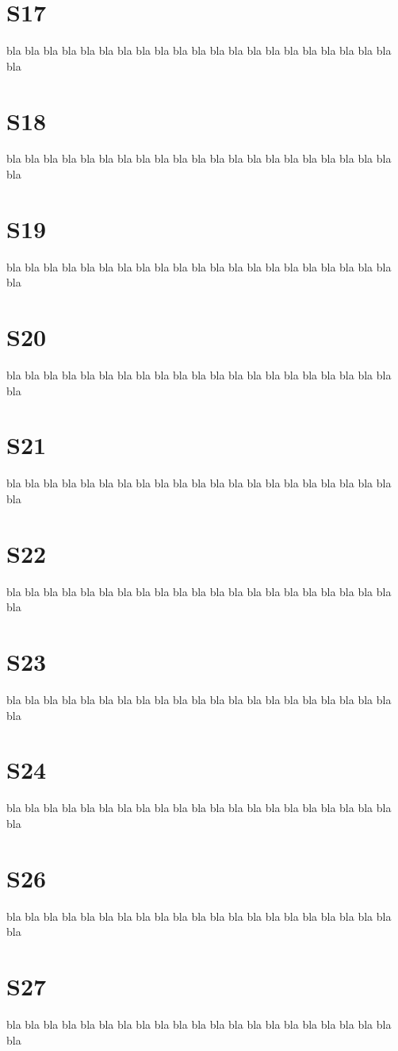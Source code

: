 \documentclass[12pt,a4paper]{report} %
\begin{document}
\section{S17}
bla bla bla bla bla bla bla bla bla bla bla
bla bla bla bla bla bla bla bla bla bla bla
\section{S18}
bla bla bla bla bla bla bla bla bla bla bla
bla bla bla bla bla bla bla bla bla bla bla
\section{S19}
bla bla bla bla bla bla bla bla bla bla bla
bla bla bla bla bla bla bla bla bla bla bla
\section{S20}
bla bla bla bla bla bla bla bla bla bla bla
bla bla bla bla bla bla bla bla bla bla bla
\section{S21}
bla bla bla bla bla bla bla bla bla bla bla
bla bla bla bla bla bla bla bla bla bla bla
\section{S22}
bla bla bla bla bla bla bla bla bla bla bla
bla bla bla bla bla bla bla bla bla bla bla
\section{S23}
bla bla bla bla bla bla bla bla bla bla bla
bla bla bla bla bla bla bla bla bla bla bla
\section{S24}
bla bla bla bla bla bla bla bla bla bla bla
bla bla bla bla bla bla bla bla bla bla bla
\section{S26}
bla bla bla bla bla bla bla bla bla bla bla
bla bla bla bla bla bla bla bla bla bla bla
\section{S27}
bla bla bla bla bla bla bla bla bla bla bla
bla bla bla bla bla bla bla bla bla bla bla
\end{document}

